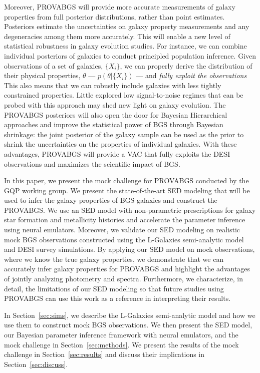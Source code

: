 Moreover, PROVABGS will provide more accurate measurements of galaxy properties
from full posterior distributions, rather than point estimates. 
Posteriors estimate the uncertainties on galaxy property measurements and any
degeneracies among them more accurately. 
This will enable a new level of statistical robustness in galaxy evolution
studies.
For instance, we can combine individual posteriors of galaxies to conduct
principled population inference.
Given observations of a set of galaxies, $\{X_i\}$, we can properly derive the
distribution of their physical properties, $\theta$ --- $p(\theta | \{ X_i \})$
--- and \emph{fully exploit the observations} 
This also means that we can robustly include galaxies with less tightly
constrained properties.  
Little explored low signal-to-noise regimes that can be probed with this
approach may shed new light on galaxy evolution.
The PROVABGS posteriors will also open the door for Bayesian Hierarchical
approaches and improve the statistical power of BGS through Bayesian shrinkage:
the joint posterior of the galaxy sample can be used as the prior to shrink the
uncertainties on the properties of individual galaxies. 
With these advantages, PROVABGS will provide a VAC that fully exploits the
DESI observations and maximizes the scientific impact of BGS. 

In this paper, we present the mock challenge for PROVABGS conducted by the GQP
working group. 
We present the state-of-the-art SED modeling that will be used to infer the
galaxy properties of BGS galaxies and construct the PROVABGS. 
We use an SED model with non-parametric prescriptions for galaxy star formation
and metallicity histories and accelerate the parameter inference using neural
emulators. 
Moreover, we validate our SED modeling on realistic mock BGS observations
constructed using the {\sc L-Galaxies} semi-analytic
model~\citep{henriques2015} and DESI survey simulations. 
By applying our SED model on mock observations, where we know the true galaxy
properties, we demonstrate that we can accurately infer galaxy properties for
PROVABGS and highlight the advantages of jointly analyzing photometry and
spectra. 
Furthermore, we characterize, in detail, the limitations of our SED modeling so
that future studies using PROVABGS can use this work as a reference in
interpreting their results. 

In Section~\ref{sec:sims}, we describe the {\sc L-Galaxies} semi-analytic
model and how we use them to construct mock BGS observations. 
We then present the SED model, our Bayesian parameter inference framework with
neural emulators, and the mock challenge in Section~\ref{sec:methods}. 
We present the results of the mock challenge in Section~\ref{sec:results} and
discuss their implications in Section~\ref{sec:discuss}. 
